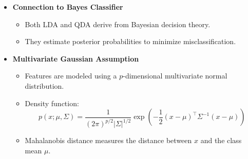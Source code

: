\documentclass[12pt]{article}
\begin{document}
\begin{itemize}
    \item \textbf{Connection to Bayes Classifier}
    \begin{itemize}
        \item Both LDA and QDA derive from Bayesian decision theory.
        \item They estimate posterior probabilities to minimize misclassification.
    \end{itemize}
    
    \item \textbf{Multivariate Gaussian Assumption}
    \begin{itemize}
        \item Features are modeled using a $p$-dimensional multivariate normal distribution.
        \item Density function:
        \[
        p(x; \mu, \Sigma) = \frac{1}{(2\pi)^{p/2} |\Sigma|^{1/2}} \exp\left(-\frac{1}{2}(x-\mu)^\top \Sigma^{-1}(x-\mu)\right)
        \]
        \item Mahalanobis distance measures the distance between $x$ and the class mean $\mu$.
    \end{itemize}
    

\end{itemize}
\end{document}
